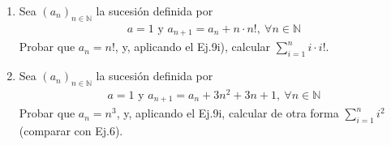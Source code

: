 \begin{enunciado}{\ejercicio}
    \begin{enumerate}[label=\roman*)]
        \item Sea $(a_n)_{n \in \mathbb{N}}$ la sucesión definida por
        \begin{align*}
            a = 1 \text{ y } a_{n+1} = a_n + n \cdot n!,\ \forall n \in \mathbb{N}
        \end{align*}
        Probar que $a_n = n!$, y, aplicando el Ej.9i), calcular $\displaystyle \sum_{i=1}^{n}i \cdot i!$.
        
        \item Sea $(a_n)_{n \in \mathbb{N}}$ la sucesión definida por
        \begin{align*}
            a = 1 \text{ y } a_{n+1} = a_n + 3n^2 + 3n + 1,\ \forall n \in \mathbb{N}
        \end{align*}
        Probar que $a_n = n^3$, y, aplicando el Ej.9i, calcular de otra forma $\displaystyle \sum_{i=1}^{n}i^2$ 
        (comparar con Ej.6).
    \end{enumerate}
\end{enunciado}

